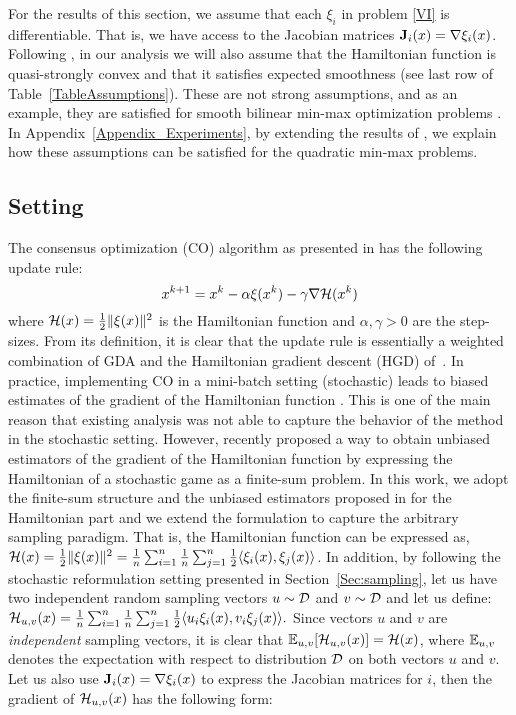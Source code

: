 \documentclass{article}
\begin{document}
For the results of this section, we assume that each $\xi_i$ in problem \eqref{VI} is differentiable. That is, we have access to the Jacobian matrices $\mathbf{J}_i(x)=\nabla\xi_i(x)$. Following \cite{loizou2020stochastic}, in our analysis we will also assume that the Hamiltonian function is quasi-strongly convex and that it satisfies expected smoothness (see last row of Table~\ref{TableAssumptions}). These are not strong assumptions, and as an example, they are satisfied for smooth bilinear min-max optimization problems \cite{loizou2020stochastic}. In Appendix~\ref{Appendix_Experiments}, by extending the results of \cite{loizou2020stochastic}, we explain how these assumptions can be satisfied for the quadratic min-max problems.

\subsection{Setting}
The consensus optimization (CO) algorithm as presented in \cite{mescheder2017numerics} has the following update rule:
\begin{equation}
\label{CO_Rule}
x^{k+1}=x^k - \alpha \xi(x^k) - \gamma \nabla {\cal H}(x^k)
\end{equation}
where ${\cal H}(x)= \frac{1}{2} \|\xi(x)\|^2$ is the Hamiltonian function and $\alpha, \gamma >0$ are the step-sizes. From its definition, it is clear that the update rule is essentially a weighted combination of GDA and the Hamiltonian gradient descent (HGD) of~\cite{balduzzi2018mechanics}.
In practice, implementing CO in a mini-batch setting (stochastic) leads to biased estimates of the gradient of the Hamiltonian function \citep{mescheder2017numerics}. This is one of the main reason that existing analysis was not able to capture the behavior of the method in the stochastic setting. However, recently \cite{loizou2020stochastic} proposed a way to obtain unbiased estimators of the gradient of the Hamiltonian function by expressing the Hamiltonian of a stochastic game as a finite-sum problem. In this work, we adopt the finite-sum structure and the unbiased estimators proposed in \cite{loizou2020stochastic} for the Hamiltonian part and we extend the formulation to capture the arbitrary sampling paradigm. That is, the Hamiltonian function can be expressed as, ${\cal H}(x)= \frac{1}{2} \|\xi(x)\|^2 = \frac{1}{n} \sum_{i=1}^n \frac{1}{n} \sum_{j=1}^n \frac{1}{2} \langle  \xi_i(x),  \xi_j(x)\rangle$. 
In addition, by following the stochastic reformulation setting presented in Section~\ref{Sec:sampling}, let us have two independent random sampling vectors $u\sim {\cal D}$ and $v\sim {\cal D}$ and let us define: ${\cal H}_{u,v}(x)=\frac{1}{n} \sum_{i=1}^n \frac{1}{n} \sum_{j=1}^n \frac{1}{2} \langle u_i \xi_i(x),  v_i \xi_j(x)\rangle.$ Since vectors $u$ and $v$ are \emph{independent} sampling vectors, it is clear that $\mathbb{E}_{u,v} [{\cal H}_{u,v}(x)]= {\cal H}(x)$, where $\mathbb{E}_{u,v}$ denotes the expectation with respect to distribution ${\cal D}$ on both vectors $u$ and $v$. Let us also use $\mathbf{J}_i(x)=\nabla \xi_i(x)$ to express the Jacobian matrices for $i$, then the gradient of ${\cal H}_{u,v}(x)$ has the following form:
\end{document}
